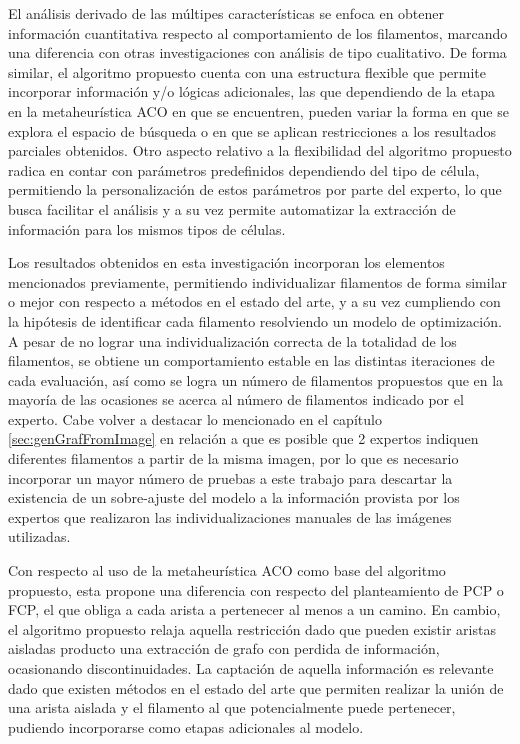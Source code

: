 El an\'alisis derivado de las m\'ultipes caracter\'isticas se enfoca en obtener informaci\'on cuantitativa respecto al comportamiento de los filamentos, marcando una diferencia con otras investigaciones con an\'alisis de tipo cualitativo. De forma similar, el algoritmo propuesto cuenta con una estructura flexible que permite incorporar informaci\'on y/o l\'ogicas adicionales, las que dependiendo de la etapa en la metaheur\'istica ACO en que se encuentren, pueden variar la forma en que se explora el espacio de b\'usqueda o en que se aplican restricciones a los resultados parciales obtenidos. Otro aspecto relativo a la flexibilidad del algoritmo propuesto radica en contar con  par\'ametros predefinidos dependiendo del tipo de c\'elula, permitiendo la personalizaci\'on de estos par\'ametros por parte del experto, lo que busca facilitar el an\'alisis y a su vez permite automatizar la extracci\'on de informaci\'on para los mismos tipos de c\'elulas.


Los resultados obtenidos en esta investigaci\'on incorporan los elementos mencionados previamente, permitiendo individualizar filamentos de forma similar o mejor con respecto a m\'etodos en el estado del arte, y a su vez cumpliendo con la hip\'otesis de identificar cada filamento resolviendo un modelo de optimizaci\'on. A pesar de no lograr una individualizaci\'on correcta de la totalidad de los filamentos, se obtiene un comportamiento estable en las distintas iteraciones de cada evaluaci\'on, as\'i como se logra un n\'umero de filamentos propuestos que en la mayor\'ia de las ocasiones se acerca al n\'umero de filamentos indicado por el experto. Cabe volver a destacar lo mencionado en el cap\'itulo \ref{sec:genGrafFromImage} en relaci\'on a que es posible que 2 expertos indiquen diferentes filamentos a partir de la misma imagen, por lo que es necesario incorporar un mayor n\'umero de pruebas a este trabajo para descartar la existencia de un sobre-ajuste del modelo a la informaci\'on provista por los expertos que realizaron las individualizaciones manuales de las im\'agenes utilizadas.


Con respecto al uso de la metaheur\'istica ACO como base del algoritmo propuesto, esta propone una diferencia con respecto del planteamiento de PCP o FCP, el que obliga a cada arista a pertenecer al menos a un camino. En cambio, el algoritmo propuesto relaja aquella restricci\'on dado que pueden existir aristas aisladas producto una extracci\'on de grafo con perdida de informaci\'on, ocasionando discontinuidades. La captaci\'on de aquella informaci\'on es relevante dado que existen m\'etodos en el estado del arte que permiten realizar la uni\'on de una arista aislada y el filamento al que potencialmente puede pertenecer, pudiendo incorporarse como etapas adicionales al modelo. 


